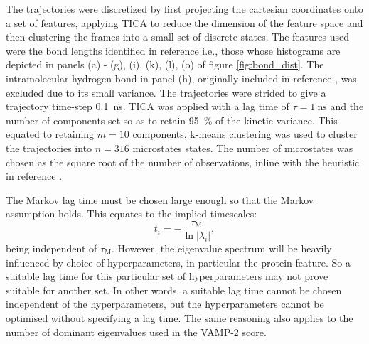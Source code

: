 The trajectories were discretized by first projecting the cartesian coordinates onto a set of features, applying TICA to reduce the dimension of the feature space and then clustering the frames into a small set of discrete states.  The features used were the bond lengths identified in reference \cite{ranaghanInitioQMMM2017} i.e., those whose histograms are depicted in panels (a) - (g), (i), (k), (l), (o) of figure \ref{fig:bond_dist}. The intramolecular hydrogen bond in panel (h), originally included in reference \cite{ranaghanInitioQMMM2017}, was excluded due to its small variance. The trajectories were strided to give a trajectory time-step \SI{0.1}{\nano\second}. TICA was applied with a lag time of $\tau=\SI{1}{\nano\second}$ and the number of components set so as to retain \SI{95}{\percent} of the kinetic variance. This equated to retaining $m=10$ components. k-means clustering was used to cluster the trajectories into $n = 316$ microstates states. The number of microstates was chosen as the square root of the number of observations, inline with the heuristic in reference  \cite{husicWardClusteringImproves2017a}. 

The Markov lag time must be chosen large enough so that the Markov assumption holds. This equates to the implied timescales:
\begin{equation*}
    t_{i}=-\frac{\tau_{\mathrm{M}}}{\ln{|\lambda_{i}|}}, 
\end{equation*} 
being independent of $\tau_{\mathrm{M}}$. However, the eigenvalue spectrum will be heavily influenced by choice of hyperparameters, in particular the protein feature. So a suitable lag time for this particular set of hyperparameters may not prove suitable for another set. In other words, a suitable lag time cannot be chosen independent of the hyperparameters, but the hyperparameters cannot be optimised without specifying a lag time. The same reasoning also applies to the number of dominant eigenvalues used in the VAMP-2 score. 

